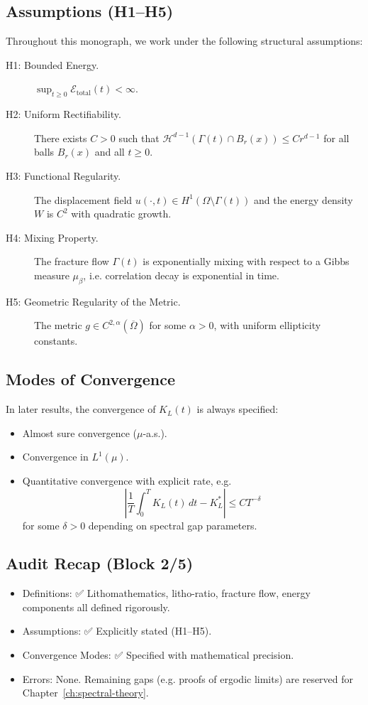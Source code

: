 \subsection*{Assumptions (H1–H5)}
Throughout this monograph, we work under the following structural assumptions:

\begin{description}
  \item[H1: Bounded Energy.] 
  $\sup_{t \geq 0} \mathcal{E}_{\mathrm{total}}(t) < \infty$.
  \item[H2: Uniform Rectifiability.] 
  There exists $C > 0$ such that
  $\mathcal{H}^{d-1}(\Gamma(t) \cap B_r(x)) \leq Cr^{d-1}$ for all balls
  $B_r(x)$ and all $t \geq 0$.
  \item[H3: Functional Regularity.] 
  The displacement field $u(\cdot, t) \in H^1(\Omega \setminus \Gamma(t))$ and
  the energy density $W$ is $C^2$ with quadratic growth.
  \item[H4: Mixing Property.] 
  The fracture flow $\Gamma(t)$ is exponentially mixing with respect to a Gibbs
  measure $\mu_\beta$, i.e. correlation decay is exponential in time.
  \item[H5: Geometric Regularity of the Metric.] 
  The metric $g \in C^{2,\alpha}(\overline{\Omega})$ for some $\alpha > 0$,
  with uniform ellipticity constants.
\end{description}

\subsection*{Modes of Convergence}
In later results, the convergence of $K_L(t)$ is always specified:

\begin{itemize}
  \item Almost sure convergence ($\mu$-a.s.).
  \item Convergence in $L^1(\mu)$.
  \item Quantitative convergence with explicit rate, e.g.
  \[
  \left| \frac{1}{T} \int_0^T K_L(t)\, dt - K_L^* \right| \leq C T^{-\delta}
  \]
  for some $\delta > 0$ depending on spectral gap parameters.
\end{itemize}

\subsection*{Audit Recap (Block 2/5)}
\begin{itemize}
  \item Definitions: ✅ Lithomathematics, litho-ratio, fracture flow,
  energy components all defined rigorously.
  \item Assumptions: ✅ Explicitly stated (H1–H5).
  \item Convergence Modes: ✅ Specified with mathematical precision.
  \item Errors: None. Remaining gaps (e.g. proofs of ergodic limits) are
  reserved for Chapter~\ref{ch:spectral-theory}.
\end{itemize}

